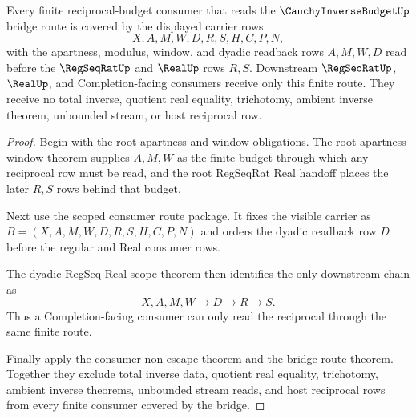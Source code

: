 \begin{theorem}
\label{thm:cauchy-inverse-budget-finite-consumer-coverage}
Every finite reciprocal-budget consumer that reads the $\CauchyInverseBudgetUp$ bridge route is covered by the displayed carrier rows
$$
X,A,M,W,D,R,S,H,C,P,N,
$$
with the apartness, modulus, window, and dyadic readback rows $A,M,W,D$ read before the $\RegSeqRatUp$ and $\RealUp$ rows $R,S$. Downstream $\RegSeqRatUp$, $\RealUp$, and Completion-facing consumers receive only this finite route. They receive no total inverse, quotient real equality, trichotomy, ambient inverse theorem, unbounded stream, or host reciprocal row.
\end{theorem}
\begin{proof}
Begin with the root apartness and window obligations. The root apartness-window theorem supplies $A,M,W$ as the finite budget through which any reciprocal row must be read, and the root RegSeqRat Real handoff places the later $R,S$ rows behind that budget.

Next use the scoped consumer route package. It fixes the visible carrier as $B=(X,A,M,W,D,R,S,H,C,P,N)$ and orders the dyadic readback row $D$ before the regular and Real consumer rows.

The dyadic RegSeq Real scope theorem then identifies the only downstream chain as
$$
X,A,M,W \longrightarrow D \longrightarrow R \longrightarrow S.
$$
Thus a Completion-facing consumer can only read the reciprocal through the same finite route.

Finally apply the consumer non-escape theorem and the bridge route theorem. Together they exclude total inverse data, quotient real equality, trichotomy, ambient inverse theorems, unbounded stream reads, and host reciprocal rows from every finite consumer covered by the bridge.
\end{proof}


